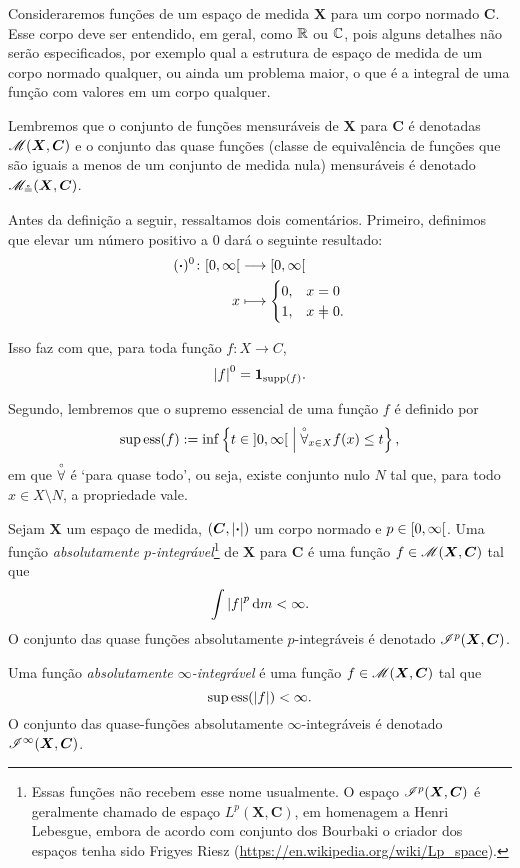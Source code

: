 Consideraremos funções de um espaço de medida $\bm X$ para um corpo normado $\bm C$. Esse corpo deve ser entendido, em geral, como $\mathbb{R}$ ou $\mathbb{C}$, pois alguns detalhes não serão especificados, por exemplo qual a estrutura de espaço de medida de um corpo normado qualquer, ou ainda um problema maior, o que é a integral de uma função com valores em um corpo qualquer.

Lembremos que o conjunto de funções mensuráveis de $\bm X$ para $\bm C$ é denotadas $\mathscr{M}(\bm X,\bm C)$ e o conjunto das quase funções (classe de equivalência de funções que são iguais a menos de um conjunto de medida nula) mensuráveis é denotado $\mathscr{M}_{\circeq}(\bm X,\bm C)$.

Antes da definição a seguir, ressaltamos dois comentários. Primeiro, definimos que elevar um número positivo a $0$ dará o seguinte resultado:
	\begin{align*}
	\func{(\var)^0}{\intfa{0}{\infty}}{\intfa{0}{\infty}}{x}{
		\begin{cases}
			0,& x=0 \\
			1,& x \neq 0.
		\end{cases}
	}
	\end{align*}

Isso faz com que, para toda função $f\colon X \to C$,
	\begin{equation*}
	\left\vert{f}\right\vert^0 = {\bm 1}_{\operatorname{supp}(f)}.
	\end{equation*}

Segundo, lembremos que o supremo essencial de uma função $f$ é definido por
	\begin{equation*}
	\supess (f) := \inf \set{t \in \intaa{0}{\infty}}{\qforall_{x \in X} f(x) \leq t},
	\end{equation*}
em que $\qforall$ é `para quase todo', ou seja, existe conjunto nulo $N$ tal que, para todo $x \in X \setminus N$, a propriedade vale.

\begin{definition}
Sejam $\bm X$ um espaço de medida, $(\bm C,\left\vert{\bm{\cdot}}\right\vert)$ um corpo normado e $p \in \left[{0},{\infty}\right[$. Uma função \emph{absolutamente $p$-integrável}\footnote{Essas funções não recebem esse nome usualmente. O espaço $\mathscr{I}^p(\bm X,\bm C)$ é geralmente chamado de espaço $L^p(\bm X,\bm C)$, em homenagem a Henri Lebesgue, embora de acordo com conjunto dos Bourbaki o criador dos espaços tenha sido Frigyes Riesz (\url{https://en.wikipedia.org/wiki/Lp_space}).} de $\bm X$ para $\bm C$ é uma função $f \in \mathscr{M}(\bm X,\bm C)$ tal que
	\begin{equation*}
	\int \left\vert{f}\right\vert^p \mathrm{d}m < \infty.
	\end{equation*}
O conjunto das quase funções absolutamente $p$-integráveis é denotado $\mathscr{I}^p(\bm X,\bm C)$.

Uma função \emph{absolutamente $\infty$-integrável} é uma função $f \in \mathscr{M}(\bm X,\bm C)$ tal que
	\begin{equation*}
	\operatorname{sup\,ess}(\left\vert{f}\right\vert) < \infty.
	\end{equation*}
O conjunto das quase-funções absolutamente $\infty$-integráveis é denotado $\mathscr{I}^\infty(\bm X,\bm C)$.
\end{definition}

